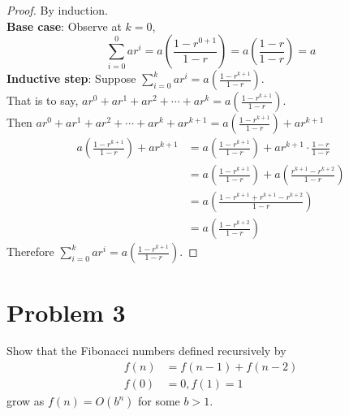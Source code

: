 \documentclass{article}
\begin{document}
\begin{proof}
    By induction. \\
    \textbf{Base case}: Observe at \(k = 0\),
    \begin{equation*}
        \sum_{i=0}^{0}{ar^i} = a \left( \frac{1-r^{0+1}}{1-r} \right) = a \left( \frac{1-r}{1-r} \right) = a
    \end{equation*}
    \textbf{Inductive step}: Suppose \(\sum_{i=0}^{k}{ar^i} = a \left( \frac{1-r^{k+1}}{1-r} \right)\). \\
    That is to say, \(ar^0 + ar^1 + ar^2 + \cdots + ar^k = a \left(\frac{1-r^{k+1}}{1-r}\right)\). \\
    Then \(ar^0 + ar^1 + ar^2 + \cdots + ar^k + ar^{k+1} = a \left(\frac{1-r^{k+1}}{1-r}\right) + ar^{k+1}\)
    \begin{align*}
        a \left(\frac{1-r^{k+1}}{1-r}\right) + ar^{k+1} & = a \left(\frac{1-r^{k+1}}{1-r}\right) + ar^{k+1} \cdot \frac{1-r}{1-r}             \\
                                                        & = a \left(\frac{1-r^{k+1}}{1-r}\right) + a \left(\frac{r^{k+1}-r^{k+2}}{1-r}\right) \\
                                                        & = a \left(\frac{1-r^{k+1}+r^{k+1}-r^{k+2}}{1-r}\right)                              \\
                                                        & = a \left(\frac{1-r^{k+2}}{1-r}\right)
    \end{align*}
    Therefore \(\sum_{i=0}^{k}{ar^i} = a \left( \frac{1-r^{k+1}}{1-r} \right)\).
\end{proof}

\pagebreak

\section*{Problem 3}
Show that the Fibonacci numbers defined recursively by
\begin{align*}
    f(n) & = f(n-1) + f(n-2) \\
    f(0) & = 0, f(1) = 1
\end{align*}
grow as \(f(n) = O(b^n)\) for some \(b > 1\).
\end{document}
